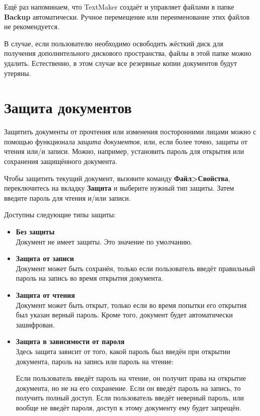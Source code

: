 ﻿\documentclass[a4paper,10pt]{article}
\begin{document}
Ещё раз напоминаем, что TextMaker создаёт и управляет файлами в папке \textbf{Backup} автоматически. Ручное перемещение или переименование этих файлов не рекомендуется.

В случае, если пользователю необходимо освободить жёсткий диск для получения дополнительного дискового пространства, файлы в этой папке можно удалить. Естественно, в этом случае все резервные копии документов будут утеряны.

\section{Защита документов} \label{sec:защитадокументов}
Защитить документы от прочтения или изменения посторонними лицами можно с помощью функционала \textit{защита документов}, или, если более точно, защиты от чтения или/и записи. Можно, например, установить пароль для открытия или сохранения защищённого документа.

Чтобы защитить текущий документ, вызовите команду \textbf{Файл>Свойства}, переключитесь на вкладку \textbf{Защита} и выберите нужный тип защиты. Затем введите пароль для чтения и/или записи.

Доступны следующие типы защиты:

\begin{itemize}
 \item \textbf{Без защиты}\\
 Документ не имеет защиты. Это значение по умолчанию.
 \item \textbf{Защита от записи}\\
 Документ может быть сохранён, только если пользователь введёт правильный пароль на запись во время открытия документа.
 \item \textbf{Защита от чтения}\\
 Документ может быть открыт, только если во время попытки его открытия был указан верный пароль. Кроме того, документ будет автоматически зашифрован.
 \item \textbf{Защита в зависимости от пароля}\\
 Здесь защита зависит от того, какой пароль был введён при открытии документа, пароль на запись или пароль на чтение:
 
 Если пользователь введёт пароль на чтение, он получит права на открытие документа, но не на его сохранение. Если он введёт пароль на запись, то получить полный доступ. Если пользователь введёт неверный пароль, или вообще не введёт пароля, доступ к этому документу
ему будет запрещён.
\end{itemize}
\end{document}
